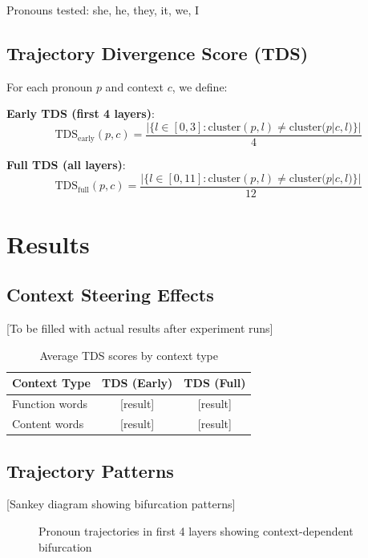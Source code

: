 \documentclass[11pt]{article}
\begin{document}
Pronouns tested: she, he, they, it, we, I

\subsection{Trajectory Divergence Score (TDS)}

For each pronoun $p$ and context $c$, we define:

\textbf{Early TDS (first 4 layers)}:
\begin{equation}
\text{TDS}_{\text{early}}(p,c) = \frac{|\{l \in [0,3] : \text{cluster}(p,l) \neq \text{cluster}(p|c,l)\}|}{4}
\end{equation}

\textbf{Full TDS (all layers)}:
\begin{equation}
\text{TDS}_{\text{full}}(p,c) = \frac{|\{l \in [0,11] : \text{cluster}(p,l) \neq \text{cluster}(p|c,l)\}|}{12}
\end{equation}

\section{Results}

\subsection{Context Steering Effects}

[To be filled with actual results after experiment runs]

\begin{table}[h]
\centering
\caption{Average TDS scores by context type}
\begin{tabular}{lcc}
\toprule
Context Type & TDS (Early) & TDS (Full) \\
\midrule
Function words & [result] & [result] \\
Content words & [result] & [result] \\
\bottomrule
\end{tabular}
\end{table}

\subsection{Trajectory Patterns}

[Sankey diagram showing bifurcation patterns]

\begin{figure}[H]
\centering
\caption{Pronoun trajectories in first 4 layers showing context-dependent bifurcation}
\label{fig:sankey_early}
\end{figure}
\end{document}
